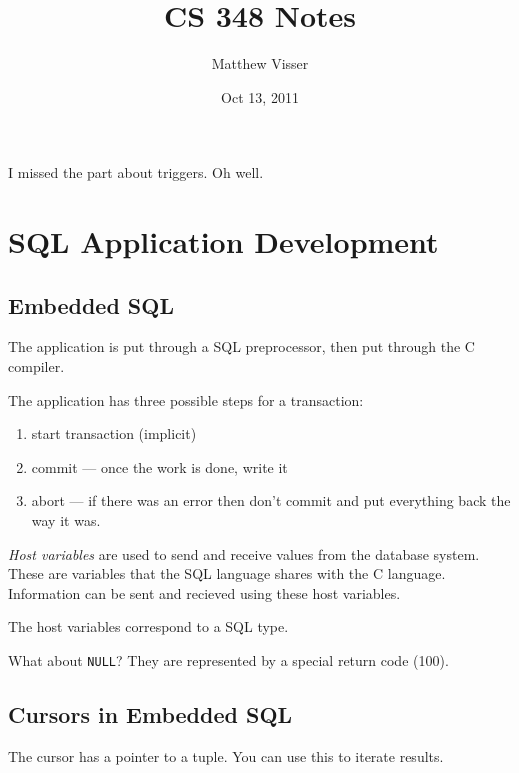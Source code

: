 \documentclass[12pt]{article}
\begin{document}
\title{CS 348 Notes}
\author{Matthew Visser}
\date{Oct 13, 2011}
\maketitle

I missed the part about triggers. Oh well.

\section{SQL Application Development}

\subsection{Embedded SQL}

The application is put through a SQL preprocessor, then put through the C
compiler.

The application has three possible steps for a transaction:
\begin{enumerate}
	\item start transaction (implicit)
	\item commit --- once the work is done, write it
	\item abort --- if there was an error then don't commit and put everything
		back the way it was.
\end{enumerate}

\emph{Host variables} are used to send and receive values from the database
system. These are variables that the SQL language shares with the C language.
Information can be sent and recieved using these host variables.

The host variables correspond to a SQL type.

What about \texttt{NULL}? They are represented by a special return code (100).

\subsection{Cursors in Embedded SQL}

The cursor has a pointer to a tuple. You can use this to iterate results.
\end{document}
